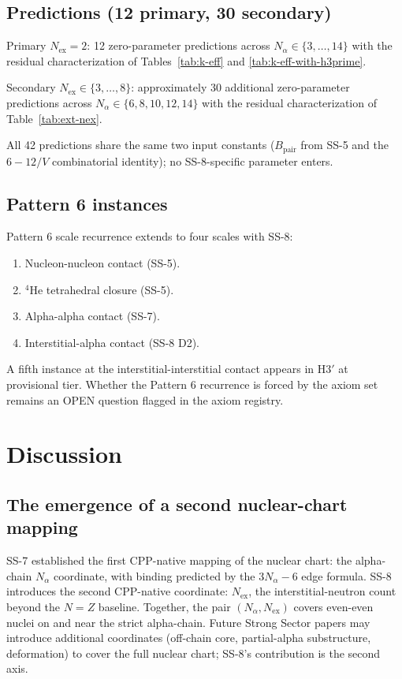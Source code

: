 \documentclass[11pt,letterpaper]{article}
\theoremstyle{definition}
\newcommand{\Bpair}{B_{\text{pair}}}
\newcommand{\Nalpha}{N_\alpha}
\newcommand{\Nex}{N_{\text{ex}}}
\begin{document}
\subsection{Predictions (12 primary, 30 secondary)}
Primary $\Nex = 2$: 12 zero-parameter predictions across $\Nalpha \in \{3, \ldots, 14\}$ with the residual characterization of Tables~\ref{tab:k-eff} and \ref{tab:k-eff-with-h3prime}.

Secondary $\Nex \in \{3, \ldots, 8\}$: approximately 30 additional zero-parameter predictions across $\Nalpha \in \{6, 8, 10, 12, 14\}$ with the residual characterization of Table~\ref{tab:ext-nex}.

All 42 predictions share the same two input constants ($\Bpair$ from SS-5 and the $6 - 12/V$ combinatorial identity); no SS-8-specific parameter enters.

\subsection{Pattern 6 instances}
Pattern 6 scale recurrence extends to four scales with SS-8:
\begin{enumerate}
  \item Nucleon-nucleon contact (SS-5).
  \item ${}^{4}\mathrm{He}$ tetrahedral closure (SS-5).
  \item Alpha-alpha contact (SS-7).
  \item Interstitial-alpha contact (SS-8 D2).
\end{enumerate}
A fifth instance at the interstitial-interstitial contact appears in H3$'$ at provisional tier. Whether the Pattern 6 recurrence is forced by the axiom set remains an OPEN question flagged in the axiom registry.


\section{Discussion}
\label{sec:discussion}

\subsection{The emergence of a second nuclear-chart mapping}
\label{sec:second-mapping}

SS-7 established the first CPP-native mapping of the nuclear chart: the alpha-chain $\Nalpha$ coordinate, with binding predicted by the $3\Nalpha - 6$ edge formula. SS-8 introduces the second CPP-native coordinate: $\Nex$, the interstitial-neutron count beyond the $N = Z$ baseline. Together, the pair $(\Nalpha, \Nex)$ covers even-even nuclei on and near the strict alpha-chain. Future Strong Sector papers may introduce additional coordinates (off-chain core, partial-alpha substructure, deformation) to cover the full nuclear chart; SS-8's contribution is the second axis.
\end{document}
